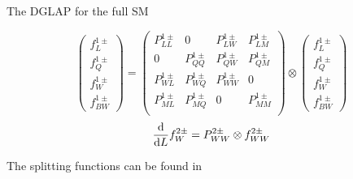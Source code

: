 \documentclass[aspectratio=169]{beamer}
\begin{document}
\begin{frame}{The DGLAP for the full SM}
\begin{small}
\begin{equation}
\begin{pmatrix}
	f_{L}^{1\pm}\\
	f_{Q}^{1\pm}\\
	f_{W}^{1\pm}\\
	f_{BW}^{1\pm}
	\end{pmatrix}=
	\begin{pmatrix}
	P_{LL}^{1\pm} & 0  & P_{LW}^{1\pm} & P_{LM}^{1\pm} \\
	0 & P_{QQ}^{1\pm}  & P_{QW}^{1\pm} & P_{QM}^{1\pm} \\
	P_{WL}^{1\pm} & P_{WQ}^{1\pm}  & P_{WW}^{1\pm} & 0 \\
	P_{ML}^{1\pm} & P_{MQ}^{1\pm}  & 0 & P_{MM}^{1\pm} \\
	\end{pmatrix}
	\otimes
	\begin{pmatrix}
	f_{L}^{1\pm}\\
	f_{Q}^{1\pm}\\
	f_{W}^{1\pm}\\
	f_{BW}^{1\pm}
	\end{pmatrix}
	\end{equation}	
	\begin{equation}\nonumber
	\frac{\dd }{\dd L} f_{W}^{2\pm}=P_{WW}^{2\pm}\otimes f_{WW}^{2\pm}
	\end{equation}
	\end{small} 
	\vspace{-1mm}
	The splitting functions can be found in 	
\end{frame}
\end{document}
